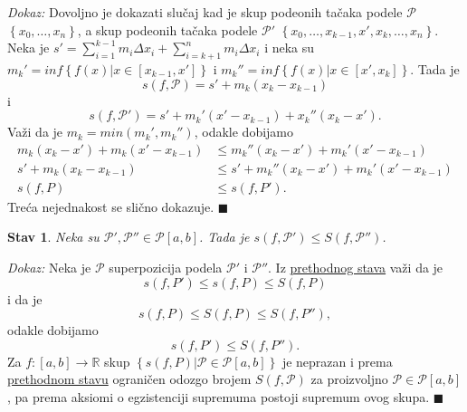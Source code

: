 \documentclass{article}
\newtheorem{stav}{Stav}[section]
\begin{document}
\textit{Dokaz:} Dovoljno je dokazati slučaj kad je skup podeonih tačaka podele $\mathcal{P}$
$\left\{x_0,\dotsc,x_n\right\}$, a skup podeonih tačaka podele $\mathcal{P}'$
$\left\{x_0,\dotsc,x_{k-1},x',x_k,\dotsc,x_n\right\}$. Neka je $\displaystyle s'=\sum_{i=1}^{k-1}m_i\Delta x_i+\sum_{i=k+1}^{n}m_i\Delta x_i$ i neka su
$m_k'=inf\left\{f\left(x\right)\big|x\in\left[x_{k-1},x'\right]\right\}$ i $m_k''=inf\left\{f\left(x\right)\big|x\in\left[x',x_k\right]\right\}$.
Tada je $$s\left(f,\mathcal{P}\right)=s'+m_k\left(x_k-x_{k-1}\right)$$
i
$$s\left(f,\mathcal{P}'\right)=s'+m_k'\left(x'-x_{k-1}\right)+x_k''\left(x_k-x'\right).$$
Važi da je $m_k=min\left(m_k',m_k''\right)$, odakle dobijamo
\begin{align*}
    m_k\left(x_k-x'\right)+m_k\left(x'-x_{k-1}\right) & \leq m_k''\left(x_k-x'\right)+m_k'\left(x'-x_{k-1}\right)    \\
    s'+m_k\left(x_k-x_{k-1}\right)                    & \leq s'+m_k''\left(x_k-x'\right)+m_k'\left(x'-x_{k-1}\right) \\
    s\left(f,P\right)                                 & \leq s\left(f,P'\right).
\end{align*}
Treća nejednakost se slično dokazuje.
\null\hfill $\blacksquare$\par

\begin{stavbox}
    \label{stav_2.2}
    \begin{stav}
        Neka su $\mathcal{P}',\mathcal{P}''\in\mathcal{P}\left[a,b\right]$. Tada je $s\left(f,\mathcal{P}'\right)\leq S\left(f,\mathcal{P}''\right)$.
    \end{stav}
\end{stavbox}

\textit{Dokaz:} Neka je $\mathcal{P}$ superpozicija podela $\mathcal{P}'$ i $\mathcal{P}''$. Iz
\hyperref[stav_2.1]{prethodnog stava} važi da je
$$s\left(f,P'\right)\leq s\left(f,P\right)\leq S\left(f,P\right)$$
i da je
$$s\left(f,P\right)\leq S\left(f,P\right)\leq S\left(f,P''\right),$$
odakle dobijamo
$$s\left(f,P'\right)\leq S\left(f,P''\right).$$
Za $f: \left[a,b\right]\longrightarrow\mathbb{R}$ skup $\left\{s\left(f,P\right)\big|\mathcal{P}\in\mathcal{P}\left[a,b\right]\right\}$
je neprazan i prema \hyperref[stav_2.2]{prethodnom stavu} ograničen odozgo brojem $S\left(f,\mathcal{P}\right)$ za proizvoljno $\mathcal{P}\in\mathcal{P}\left[a,b\right]$,
pa prema aksiomi o egzistenciji supremuma postoji supremum ovog
skupa.
\null\hfill $\blacksquare$\par
\end{document}
